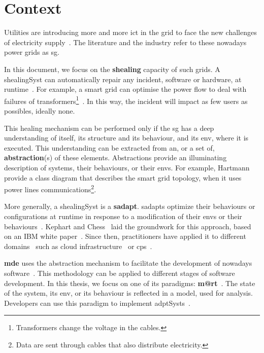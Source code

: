 \section{Context}
Utilities are introducing more and more \gls{ict} in the grid to face the new challenges of electricity supply~\cite{farhangi2010path, ipakchi2009grid, DBLP:journals/comsur/FangMXY12}.
The literature and the industry refer to these nowadays power grids as \gls{sg}.

In this document, we focus on the \textbf{\gls{shealing}} capacity of such grids.
A \gls{shealingSyst} can automatically repair any incident, software or hardware, at runtime~\cite{DBLP:journals/computer/KephartC03}.
For example, a smart grid can optimise the power flow to deal with failures of transformers\footnote{Transformers change the voltage in the cables.}~\cite{DBLP:journals/comsur/FangMXY12}.
In this way, the incident will impact as few users as possibles, ideally none. 

This healing mechanism can be performed only if the \gls{sg} has a deep understanding of itself, its \gls{structure} and its \gls{behaviour}, and its \gls{env}, where it is executed.
This understanding can be extracted from an, or a set of, \textbf{abstraction}(s) of these elements.
Abstractions provide an illuminating description of systems, their \glspl{behaviour}, or their \glspl{env}.
For example, Hartmann~\etal \cite{DBLP:conf/smartgridcomm/0001FKTPTR14} provide a class diagram that describes the smart grid topology, when it uses power lines communications\footnote{Data are sent through cables that also distribute electricity.}.

\bigskip

More generally, a \gls{shealingSyst} is a \textbf{\gls{sadapt}}. 
\Glspl{sadapt} optimize their \glspl{behaviour} or configurations at runtime in response to a modification of their \glspl{env} or their \glspl{behaviour}~\cite{DBLP:conf/dagstuhl/ChengLGIMABBBCSDFGGGKKKLMMMPSTTWW09}.
Kephart and Chess~\cite{DBLP:journals/computer/KephartC03} laid the groundwork for this approach, based on an IBM white paper~\cite{computing2006architectural}.
Since then, practitioners have applied it to different domains~\cite{DBLP:journals/corr/abs-1904-01518} such as cloud infrastructure~\cite{DBLP:conf/icac/JavadiG17, OpenStack:Watcher:Wiki, DBLP:conf/icse/BarnaKFL17} or \gls{cps}~\cite{DBLP:conf/icac/LalandaGC17, DBLP:conf/cbse/FouquetMFBPJ12, DBLP:conf/smartgridsec/0001FKNT14}.

\textbf{\Gls{mde}} uses the abstraction mechanism to facilitate the development of nowadays software~\cite{DBLP:journals/computer/Schmidt06, DBLP:conf/ifm/Kent02, DBLP:series/synthesis/2017Brambilla}.
This methodology can be applied to different stages of software development.
In this thesis, we focus on one of its paradigms: \textbf{\gls{m@rt}}~\cite{DBLP:journals/computer/BlairBF09, DBLP:journals/computer/MorinBJFS09}.
The state of the system, its \gls{env}, or its \gls{behaviour} is reflected in a \gls{model}, used for analysis.
Developers can use this paradigm to implement \glspl{adptSyst}~\cite{DBLP:journals/computer/MorinBJFS09, DBLP:conf/smartgridsec/0001FKNT14}.

